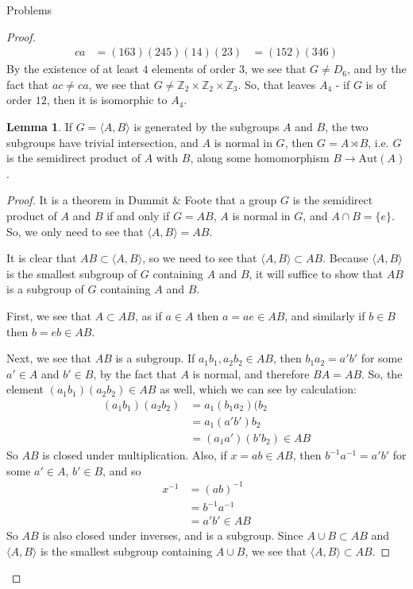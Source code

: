 \documentclass[12pt]{article}
\newcommand{\Z}{\mathbb{Z}}
\theoremstyle{definition}
\newtheorem{lemma}{Lemma}
\newenvironment{problem}[2][Problem]{\begin{trivlist}
\item[\hskip \labelsep {\bfseries #1}\hskip \labelsep {\bfseries #2.}]}{\end{trivlist}}
\begin{document}
\begin{section}{Problems}
\begin{problem}{1}
\begin{proof}
\begin{align*}
		    ca &= (163)(245)(14)(23) &= (152)(346)
		\end{align*}
		By the existence of at least $4$ elements of order $3$, we see that $G \neq D_6$, and by the fact that $ac \neq ca$, we see that $G \neq \Z_2 \times \Z_2 \times \Z_3$. So, that leaves $A_4$ - if $G$ is of order $12$, then it is isomorphic to $A_4$.
		\begin{lemma}
		    If $G = \langle A, B \rangle$ is generated by the subgroups $A$ and $B$, the two subgroups have trivial intersection, and $A$ is normal in $G$, then $G = A \rtimes B$, i.e. $G$ is the semidirect product of $A$ with $B$, along some homomorphism $B \to \text{Aut}(A)$.
		    \begin{proof}
		        It is a theorem in Dummit \& Foote that a group $G$ is the semidirect product of $A$ and $B$ if and only if $G = AB$, $A$ is normal in $G$, and $A \cap B = \{e\}$. So, we only need to see that $\langle A, B \rangle = AB$. 
		        \par It is clear that $AB \subset \langle A, B \rangle$, so we need to see that $\langle A, B \rangle \subset AB$. Because $\langle A, B \rangle$ is the smallest subgroup of $G$ containing $A$ and $B$, it will suffice to show that $AB$ is a subgroup of $G$ containing $A$ and $B$.
		        \par First, we see that $A \subset AB$, as if $a \in A$ then $a = ae \in AB$, and similarly if $b \in B$ then $b = eb \in AB$. 
		        \par Next, we see that $AB$ is a subgroup. If $a_1b_1, a_2b_2 \in AB$, then $b_1a_2 = a'b'$ for some $a' \in A$ and $b' \in B$, by the fact that $A$ is normal, and therefore $BA = AB$. So, the element $(a_1b_1)(a_2b_2) \in AB$ as well, which we can see by calculation:
		        \begin{align*}
		            (a_1b_1)(a_2b_2) &= a_1(b_1a_2)(b_2\\
		            &= a_1(a'b')b_2\\
		            &= (a_1a')(b'b_2) \in AB
		        \end{align*}
		        So $AB$ is closed under multiplication. Also, if $x = ab \in AB$, then $b^{-1}a^{-1} = a'b'$ for some  $a' \in A$, $b' \in B$, and so
		        \begin{align*}
		            x^{-1} &= (ab)^{-1}\\
		            &= b^{-1}a^{-1}\\
		            &= a'b' \in AB
		        \end{align*}
		        So $AB$ is also closed under inverses, and is a subgroup. Since $A \cup B \subset AB$ and $\langle A, B \rangle$ is the smallest subgroup containing $A \cup B$, we see that $\langle A, B \rangle \subset AB$. 

\end{proof}
\end{lemma}
\end{proof}
\end{problem}
\end{section}
\end{document}
